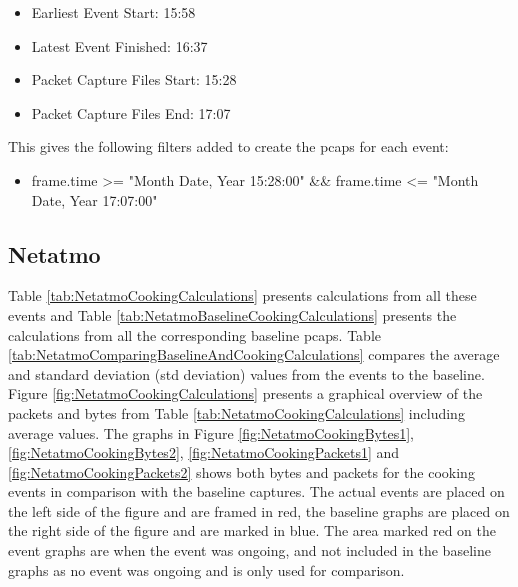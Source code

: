 \begin{itemize}
    \item Earliest Event Start: 15:58
    \item Latest Event Finished: 16:37
    \item Packet Capture Files Start: 15:28
    \item Packet Capture Files End: 17:07
\end{itemize}

This gives the following filters added to create the pcaps for each event:

\begin{itemize}
    \item frame.time >= "Month Date, Year 15:28:00" && frame.time <= "Month Date, Year 17:07:00"
\end{itemize}

\newpage
\subsection{Netatmo}
Table \ref{tab:NetatmoCookingCalculations} presents calculations from all these events and Table \ref{tab:NetatmoBaselineCookingCalculations} presents the calculations from all the corresponding baseline pcaps. Table \ref{tab:NetatmoComparingBaselineAndCookingCalculations} compares the average and standard deviation (std deviation) values from the events to the baseline. Figure \ref{fig:NetatmoCookingCalculations} presents a graphical overview of the packets and bytes from Table \ref{tab:NetatmoCookingCalculations} including average values. The graphs in Figure \ref{fig:NetatmoCookingBytes1}, \ref{fig:NetatmoCookingBytes2}, \ref{fig:NetatmoCookingPackets1} and \ref{fig:NetatmoCookingPackets2} shows both bytes and packets for the cooking events in comparison with the baseline captures. The actual events are placed on the left side of the figure and are framed in red, the baseline graphs are placed on the right side of the figure and are marked in blue. The area marked red on the event graphs are when the event was ongoing, and not included in the baseline graphs as no event was ongoing and is only used for comparison. 

